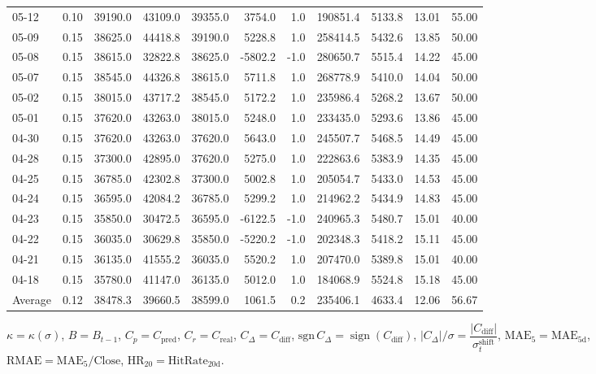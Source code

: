 \begin{threeparttable}
{\begin{tabular}{lrrrrrrrrrr}
05-12 & 0.10 & 39190.0 & 43109.0 & 39355.0 & 3754.0 & 1.0 & 190851.4 & 5133.8 & 13.01 & 55.00 \\
05-09 & 0.15 & 38625.0 & 44418.8 & 39190.0 & 5228.8 & 1.0 & 258414.5 & 5432.6 & 13.85 & 50.00 \\
05-08 & 0.15 & 38615.0 & 32822.8 & 38625.0 & -5802.2 & -1.0 & 280650.7 & 5515.4 & 14.22 & 45.00 \\
05-07 & 0.15 & 38545.0 & 44326.8 & 38615.0 & 5711.8 & 1.0 & 268778.9 & 5410.0 & 14.04 & 50.00 \\
05-02 & 0.15 & 38015.0 & 43717.2 & 38545.0 & 5172.2 & 1.0 & 235986.4 & 5268.2 & 13.67 & 50.00 \\
05-01 & 0.15 & 37620.0 & 43263.0 & 38015.0 & 5248.0 & 1.0 & 233435.0 & 5293.6 & 13.86 & 45.00 \\
04-30 & 0.15 & 37620.0 & 43263.0 & 37620.0 & 5643.0 & 1.0 & 245507.7 & 5468.5 & 14.49 & 45.00 \\
04-28 & 0.15 & 37300.0 & 42895.0 & 37620.0 & 5275.0 & 1.0 & 222863.6 & 5383.9 & 14.35 & 45.00 \\
04-25 & 0.15 & 36785.0 & 42302.8 & 37300.0 & 5002.8 & 1.0 & 205054.7 & 5433.0 & 14.53 & 45.00 \\
04-24 & 0.15 & 36595.0 & 42084.2 & 36785.0 & 5299.2 & 1.0 & 214962.2 & 5434.9 & 14.83 & 45.00 \\
04-23 & 0.15 & 35850.0 & 30472.5 & 36595.0 & -6122.5 & -1.0 & 240965.3 & 5480.7 & 15.01 & 40.00 \\
04-22 & 0.15 & 36035.0 & 30629.8 & 35850.0 & -5220.2 & -1.0 & 202348.3 & 5418.2 & 15.11 & 45.00 \\
04-21 & 0.15 & 36135.0 & 41555.2 & 36035.0 & 5520.2 & 1.0 & 207470.0 & 5389.8 & 15.01 & 40.00 \\
04-18 & 0.15 & 35780.0 & 41147.0 & 36135.0 & 5012.0 & 1.0 & 184068.9 & 5524.8 & 15.18 & 45.00 \\
Average & 0.12 & 38478.3 & 39660.5 & 38599.0 & 1061.5 & 0.2 & 235406.1 & 4633.4 & 12.06 & 56.67 \\
\bottomrule
\end{tabular}
}%
\begin{tablenotes}\footnotesize
\item $\kappa=\kappa(\sigma)$, $B=B_{t-1}$, $C_p=C_{\text{pred}}$, $C_r=C_{\text{real}}$, $C_\Delta=C_{\text{diff}}$, $\mathrm{sgn}\,C_\Delta=\operatorname{sign}(C_{\text{diff}})$, $|C_\Delta|/\sigma=\dfrac{|C_{\text{diff}}|}{\sigma_t^{\text{shift}}}$, $\mathrm{MAE}_5=\mathrm{MAE}_{5\text{d}}$, $\mathrm{RMAE}= \mathrm{MAE}_5 / \text{Close}$, $\mathrm{HR}_{20}=\mathrm{HitRate}_{20\text{d}}$.
\end{tablenotes}
\end{threeparttable}
\endgroup